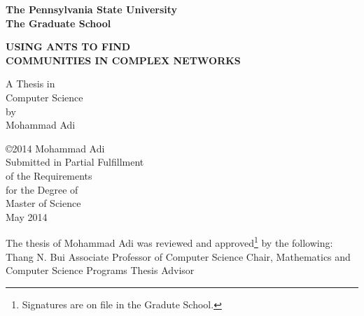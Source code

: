 \thispagestyle{empty}
\begin{titlepage}
\begin{center}
\begin{spacing}{1.5}
\textbf{\large The Pennsylvania State University} \\
\textbf{\large The Graduate School} 
\end{spacing}

\vspace{15 mm}

\begin{spacing}{2.5}
\textbf{\LARGE USING ANTS TO FIND} \\ 
\textbf{\LARGE COMMUNITIES IN COMPLEX NETWORKS} \\[15mm]
\end{spacing}

\large A Thesis in \\
\large Computer Science \\
\large by\\
\large Mohammad Adi \\

\vspace{15mm}

\large \copyright 2014 Mohammad Adi \\[15mm]

\large Submitted in Partial Fulfillment \\
\large of the Requirements \\
\large for the Degree of \\[20 mm]

\large Master of Science \\[20mm]

\large May 2014
\end{center}

\newpage
\thispagestyle{empty}

The thesis of Mohammad Adi was reviewed and approved\footnote{Signatures are on file in the Gradute School.} by the following: \\

\indent
Thang N. Bui\newline
\indent
Associate Professor of Computer Science\newline
\indent
Chair, Mathematics and Computer Science Programs \newline
\indent
Thesis Advisor

\end{titlepage}
